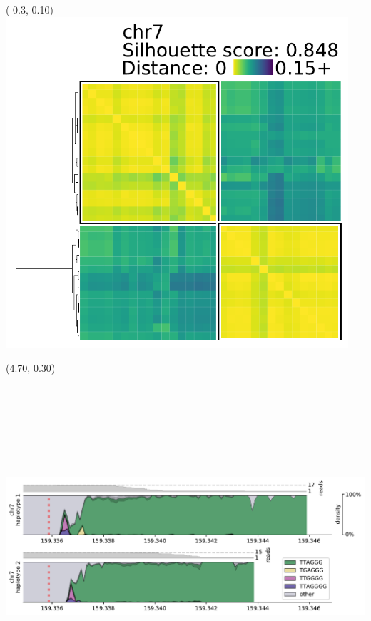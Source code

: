 \documentclass{article}
\begin{document}
\begin{textblock}{13}(-0.3,  0.10) \includegraphics[width=5in]{assets/HG002-q_arm-levenshtein-clustermaps/chr7.pdf}    \end{textblock}
\begin{textblock}{13}(4.70,  0.30) \includegraphics[height=5in]{assets/HG002-q_arm-levenshtein-densityplots/chr7.pdf}  \end{textblock}
\end{document}
